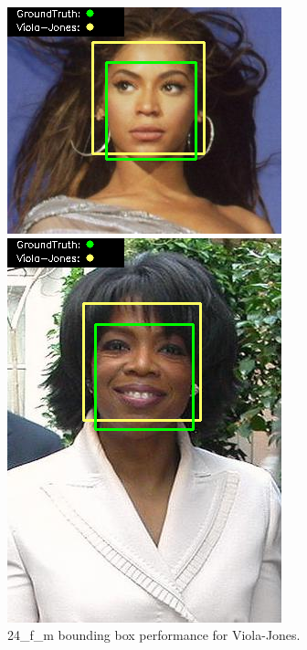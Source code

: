 \documentclass{l4proj}
\begin{document}
\begin{appendices}
\begin{figure}[h!]
  \centering
  \begin{minipage}{0.49\textwidth}
    \centering
     \includegraphics[width=\textwidth]{images/appendix/viola/24.png}
    \caption{24\_f\_m bounding box performance for Viola-Jones.}
    \label{whoopi_result}
  \end{minipage}
    \hfill
    \begin{minipage}{0.49\textwidth}
    \centering
     \includegraphics[width=\textwidth]{images/appendix/viola/25.png}

\end{minipage}
\end{figure}
\end{appendices}
\end{document}
